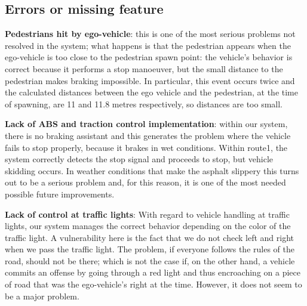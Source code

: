 \documentclass{article}
\begin{document}
\subsection{Errors or missing feature}
\textbf{Pedestrians hit by ego-vehicle}: this is one of the most serious problems not resolved in the system; what
    happens is that the pedestrian appears when the ego-vehicle is too close to the pedestrian spawn point: the vehicle's behavior
    is correct because it performs a stop manoeuver, but the small distance to the pedestrian makes braking impossible.
    In particular, this event occurs twice and the calculated distances between the ego vehicle and the pedestrian, at the time of spawning,
    are 11 and 11.8 metres respectively, so distances are too small.\newline

\textbf{Lack of ABS and traction control implementation}\label{ABS}: within our system, there is no braking assistant and this generates the
problem where the vehicle fails to stop properly, because it brakes in wet conditions.
Within route1, the system correctly detects the stop signal and proceeds to stop, but vehicle skidding occurs.
In weather conditions that make the asphalt slippery this turns out to be a serious problem and, for this reason, it is one
of the most needed possible future improvements.\newline

\textbf{Lack of control at traffic lights}:
With regard to vehicle handling at traffic lights, our system manages the correct behavior depending on the color of the
traffic light. A vulnerability here is the fact that we do not check left and right when we pass the traffic light. The problem,
if everyone follows the rules of the road, should not be there; which is not the case if, on the other hand, a vehicle commits
an offense by going through a red light and thus encroaching on a piece of road that was the ego-vehicle's right at the time.
However, it does not seem to be a major problem.
\end{document}
